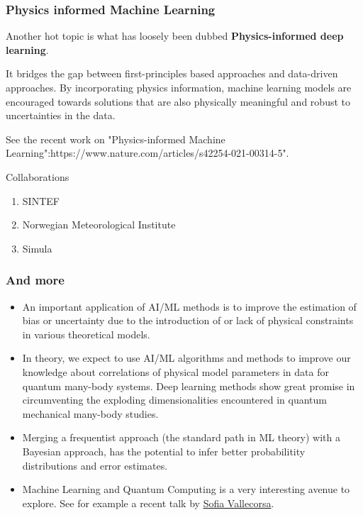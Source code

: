 \documentclass{beamer}
\begin{document}
\begin{frame}
\frametitle{Physics informed Machine Learning}

Another hot topic is what has loosely been dubbed \textbf{Physics-informed  deep learning}.

It bridges the gap between first-principles based approaches and
data-driven approaches. By incorporating physics information, machine
learning models are encouraged towards solutions that are also
physically meaningful and robust to uncertainties in the data.

See the recent work on "Physics-informed Machine Learning":https://www.nature.com/articles/s42254-021-00314-5".

\begin{block}{Collaborations  }
\begin{enumerate}
\item SINTEF

\item Norwegian Meteorological Institute

\item Simula
\end{enumerate}

\noindent
\end{block}
\end{frame}

\begin{frame}
\frametitle{And more}

\begin{block}{}
\begin{itemize}
\item An important application of AI/ML methods is to improve the estimation of bias or uncertainty due to the introduction of or lack of physical constraints in various theoretical models.

\item In theory, we expect to use AI/ML algorithms and methods to improve our knowledge about  correlations of physical model parameters in data for quantum many-body systems. Deep learning methods show great promise in circumventing the exploding dimensionalities encountered in quantum mechanical many-body studies. 

\item Merging a frequentist approach (the standard path in ML theory) with a Bayesian approach, has the potential to infer better probabilitity distributions and error estimates. 

\item Machine Learning and Quantum Computing is a very interesting avenue to explore. See for example a recent talk by \href{{https://www.youtube.com/watch?v=7WPKv1Q57os&list=PLUPPQ1TVXK7uHwCTccWMBud-zLyvAf8A2&index=5&ab_channel=ECTstar}}{Sofia Vallecorsa}.
\end{itemize}

\noindent
\end{block}
\end{frame}
\end{document}

